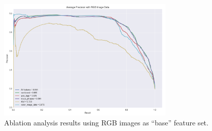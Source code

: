\documentclass[twoside,11pt]{article}
\begin{document}
\begin{figure}[h]
\centering
\includegraphics[width=0.75\textwidth]{RGB_ablation.png}
\caption{Ablation analysis results using RGB images as ``base'' feature set.}
\label{fig:rgb}
\end{figure}
\end{document}
